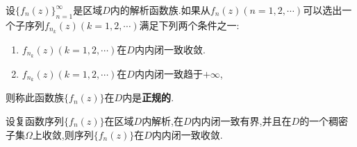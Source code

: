 \documentclass[../../main.tex]{subfiles}%
\begin{document}
\begin{definition}
设$\{f_n(z)\}_{n=1}^{\infty}$是区域$D$内的解析函数族.如果从$f_n(z)(n=1,2,\cdots)$可以选出一个子序列$f_{n_k}(z)(k=1,2,\cdots)$满足下列两个条件之一:
\begin{enumerate}[(1)]
\item $f_{n_k}(z)(k=1,2,\cdots)$在$D$内内闭一致收敛.
\item $f_{n_k}(z)(k=1,2,\cdots)$在$D$内内闭一致趋于$+\infty$,
\end{enumerate}
则称此函数族$\{f_n(z)\}$在$D$内是\textbf{正规的}.
\end{definition}

\begin{lemma}\label{lemma:复变函数--Montel定理证明引理}
设复函数序列$\{f_n(z)\}$在区域$D$内解析,在$D$内内闭一致有界,并且在$D$的一个稠密子集$\Omega$上收敛,则序列$\{f_n(z)\}$在$D$内内闭一致收敛.
\end{lemma}
\end{document}
